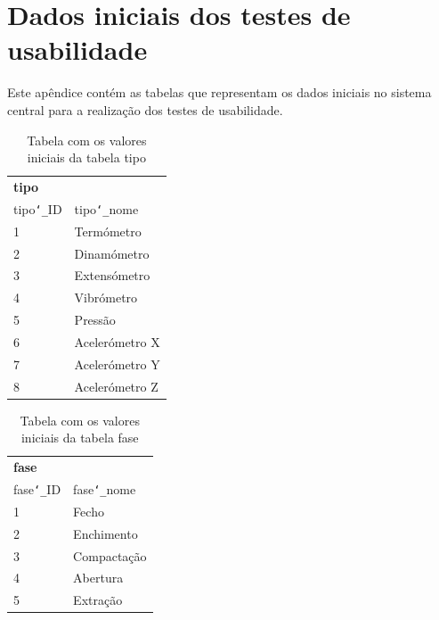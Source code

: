 \documentclass[11pt,twoside,a4paper]{report}
\begin{document}
\chapter{Dados iniciais dos testes de usabilidade}
\label{apen:usabilidade}
Este apêndice contém as tabelas que representam os dados iniciais no sistema central para a realização dos testes de usabilidade.
\begin{table}[H]
	\centering
	\begin{tabular}{|l|l|}
		\multicolumn{2}{l}{\textbf{tipo}}\\ \cline{1-2}
		tipo\texttt{\char`_}ID & tipo\texttt{\char`_}nome\\ \cline{1-2}
		1 & Termómetro\\ \cline{1-2}
		2 & Dinamómetro\\ \cline{1-2}
		3 & Extensómetro\\ \cline{1-2}
		4 & Vibrómetro\\ \cline{1-2}
		5 & Pressão\\ \cline{1-2}
		6 & Acelerómetro X\\ \cline{1-2}
		7 & Acelerómetro Y\\ \cline{1-2}
		8 & Acelerómetro Z\\ \cline{1-2}
	\end{tabular}
	\caption[Tabela com os valores iniciais da tabela tipo]{Tabela com os valores iniciais da tabela tipo}
	\label{tab:dados1}
\end{table}
\begin{table}[H]
	\centering
	\begin{tabular}{|l|l|}
		\multicolumn{2}{l}{\textbf{fase}}\\ \cline{1-2}
		fase\texttt{\char`_}ID & fase\texttt{\char`_}nome\\ \cline{1-2}
		1 & Fecho\\ \cline{1-2}
		2 & Enchimento\\ \cline{1-2}
		3 & Compactação\\ \cline{1-2}
		4 & Abertura\\ \cline{1-2}
		5 & Extração\\ \cline{1-2}
	\end{tabular}
	\caption[Tabela com os valores iniciais da tabela fase]{Tabela com os valores iniciais da tabela fase}
	\label{tab:dados2}
\end{table}
\end{document}
